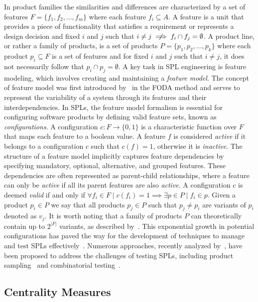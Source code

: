 In product families the similarities and differences are characterized by a set of features \(F = \{f_1, f_2, \ldots, f_m\}\) where each feature \(f_i \subseteq A\).
A feature is a unit that provides a piece of functionality that satisfies a requirement or represents a design decision and fixed \(i\) and \(j\) such that \(i \neq j \centernot\implies f_i \cap f_j = \emptyset\).
A product line, or rather a family of products, is a set of products \(P = \{p_1, p_2, \ldots, p_k\}\) where each product \(p_i \subseteq F\) is a set of features and for fixed \(i\) and \(j\) such that \(i \neq j\), it does not necessarily follow that \(p_i \cap p_j = \emptyset\).
A key task in SPL engineering is feature modeling, which involves creating and maintaining a \emph{feature model}. The concept of feature model was first introduced by~\citet{Kang90} in the FODA method and serves to represent the variability of a system through its features and their interdependencies. In SPLs, the feature model formalism is essential for configuring software products by defining valid feature sets, known as \emph{configurations}. 
A configuration \(c:F\rightarrow \{0, 1\}\) is a characteristic function over \(F\) that maps each feature to a boolean value. 
A feature $f$ is considered \emph{active} if it belongs to a configuration \(c\) such that \(c(f)=1\), otherwise it is \emph{inactive}.
The structure of a feature model implicitly captures feature dependencies by specifying mandatory, optional, alternative, and grouped features. These dependencies are often represented as parent-child relationships, where a feature can only be \emph{active} if all its parent features are also \emph{active}. 
A configuration \(c\) is deemed \emph{valid} if and only if \(\forall f_i\in F\mid c(f_i)=1\implies\exists p\in P\mid f_i\in p\).
Given a product \(p_i \in P\) we say that all products \(p_j \in P\) such that \(p_j \neq p_i\) are variants of \(p_i\) denoted as \(v_j\).
It is worth noting that a family of products \(P\) can theoretically contain up to \(2^{|F|}\) variants, as described by~\citet{Krueger06}. This exponential growth in potential configurations has paved the way for the development of techniques to manage and test SPLs effectively~\cite{Pohl06}.
Numerous approaches, recently analyzed by~\citet{Agh24}, have been proposed to address the challenges of testing SPLs, including product sampling~\cite{Patel13, AlHajjaji19, Lee19} and combinatorial testing~\cite{Oster10, Lochau12}.

\subsection{Centrality Measures}\label{subsec:bg:centrality}


